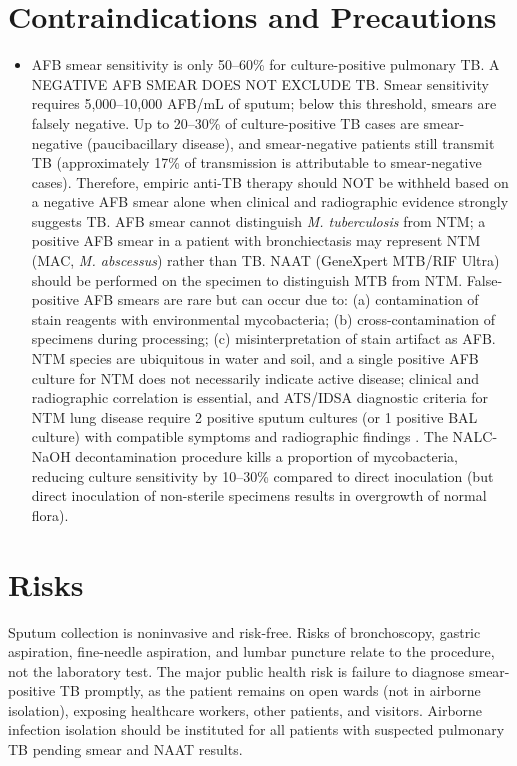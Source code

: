 \section*{Contraindications and Precautions}
\begin{itemize}
  \item AFB smear sensitivity is only 50--60\% for culture-positive pulmonary TB. A NEGATIVE AFB SMEAR DOES NOT EXCLUDE TB. Smear sensitivity requires 5,000--10,000 AFB/mL of sputum; below this threshold, smears are falsely negative. Up to 20--30\% of culture-positive TB cases are smear-negative (paucibacillary disease), and smear-negative patients still transmit TB (approximately 17\% of transmission is attributable to smear-negative cases). Therefore, empiric anti-TB therapy should NOT be withheld based on a negative AFB smear alone when clinical and radiographic evidence strongly suggests TB. AFB smear cannot distinguish \textit{M. tuberculosis} from NTM; a positive AFB smear in a patient with bronchiectasis may represent NTM (MAC, \textit{M. abscessus}) rather than TB. NAAT (GeneXpert MTB/RIF Ultra) should be performed on the specimen to distinguish MTB from NTM. False-positive AFB smears are rare but can occur due to: (a) contamination of stain reagents with environmental mycobacteria; (b) cross-contamination of specimens during processing; (c) misinterpretation of stain artifact as AFB. NTM species are ubiquitous in water and soil, and a single positive AFB culture for NTM does not necessarily indicate active disease; clinical and radiographic correlation is essential, and ATS/IDSA diagnostic criteria for NTM lung disease require 2 positive sputum cultures (or 1 positive BAL culture) with compatible symptoms and radiographic findings \cite{griffith2007official, daley2020treatment}. The NALC-NaOH decontamination procedure kills a proportion of mycobacteria, reducing culture sensitivity by 10--30\% compared to direct inoculation (but direct inoculation of non-sterile specimens results in overgrowth of normal flora).
\end{itemize}
\section*{Risks}
Sputum collection is noninvasive and risk-free. Risks of bronchoscopy, gastric aspiration, fine-needle aspiration, and lumbar puncture relate to the procedure, not the laboratory test. The major public health risk is failure to diagnose smear-positive TB promptly, as the patient remains on open wards (not in airborne isolation), exposing healthcare workers, other patients, and visitors. Airborne infection isolation should be instituted for all patients with suspected pulmonary TB pending smear and NAAT results.

